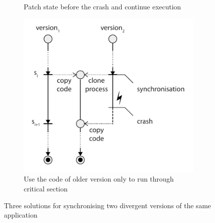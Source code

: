\begin{figure}[!t]
\begin{center}
\begin{subfigure}[b]{0.45\textwidth}
      \caption{Patch state before the crash and continue execution}
      \label{fig:recovery-solution2}
    \end{subfigure}
    \quad
    \begin{subfigure}[b]{0.45\textwidth}
      \includegraphics[width=\textwidth]{multi-version/figures/solution3}
      \caption{Use the code of older version only to run through critical section}
      \label{fig:recovery-solution3}
    \end{subfigure}
    \caption{Three solutions for synchronising two divergent versions of the same application}
    \label{fig:recovery-solutions}
  \end{center}
\end{figure}

